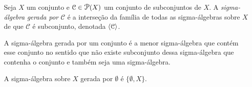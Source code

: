 \begin{defi}
Seja $X$ um conjunto e $\mathcal C \in \p(X)$ um conjunto de subconjuntos de $X$. A \emph{sigma-álgebra gerada por} $\mathcal C$ é a interseção da família de todas as sigma-álgebras sobre $X$ de que $\mathcal C$ é subconjunto, denotada $\left\langle \mathcal C \right\rangle$.
\end{defi}
	
	A sigma-álgebra gerada por um conjunto é a menor sigma-álgebra que contém esse conjunto no sentido que não existe subconjunto dessa sigma-álgebra que contenha o conjunto e também seja uma sigma-álgebra.

\begin{ex}
	A sigma-álgebra sobre $X$ gerada por $\emptyset$ é $\{\emptyset, X\}$.
\end{ex}




